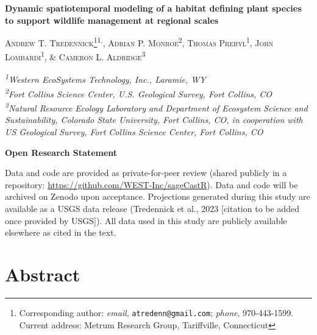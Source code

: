 \documentclass[
  12pt,
]{article}
\author{}
\date{\vspace{-2.5em}}
\begin{document}

\newcommand{\new}{\textcolor{blue}} 
\newcommand{\comm}{\textcolor{ForestGreen}}
\newcommand{\response}{\textcolor{blue}}
\newcommand{\reply}{\textcolor{blue}}
\renewcommand*{\thefootnote}{\fnsymbol{footnote}}

\begin{centering}
\textbf{\Large{Dynamic spatiotemporal modeling of a habitat defining plant species to support wildlife management at regional scales}}

\textsc{\small{Andrew T. Tredennick\footnote{Corresponding author: \textit{email}, \texttt{atredenn@gmail.com}; \textit{phone}, 970-443-1599. Current address: Metrum Research Group, Tariffville, Connecticut}\textsuperscript{1,}, Adrian P. Monroe\textsuperscript{2}, Thomas Prebyl\textsuperscript{1}, John Lombardi\textsuperscript{1}, \& Cameron L. Aldridge\textsuperscript{3}}}

\textit{\small{\textsuperscript{1}Western EcoSystems Technology, Inc., Laramie, WY}} \\
\textit{\small{\textsuperscript{2}Fort Collins Science Center, U.S. Geological Survey, Fort Collins, CO}} \\
\textit{\small{\textsuperscript{3}Natural Resource Ecology Laboratory and Department of Ecosystem Science and Sustainability, Colorado State University, Fort Collins, CO, in cooperation with US Geological Survey, Fort Collins Science Center, Fort Collins, CO}}

\end{centering}

\renewcommand*{\thefootnote}{\arabic{footnote}}
\setcounter{footnote}{0}

\bigskip{}

\noindent{}\textbf{Open Research Statement}

\noindent{}Data and code are provided as private-for-peer review (shared publicly in a repository: \url{https://github.com/WEST-Inc/sageCastR}). Data and code will be archived on Zenodo upon acceptance. Projections generated during this study are available as a USGS data release (Tredennick et al., 2023 {[}citation to be added once provided by USGS{]}). All data used in this study are publicly available elsewhere as cited in the text.

\newpage{}

\hypertarget{abstract}{%
\section{Abstract}\label{abstract}}
\end{document}

